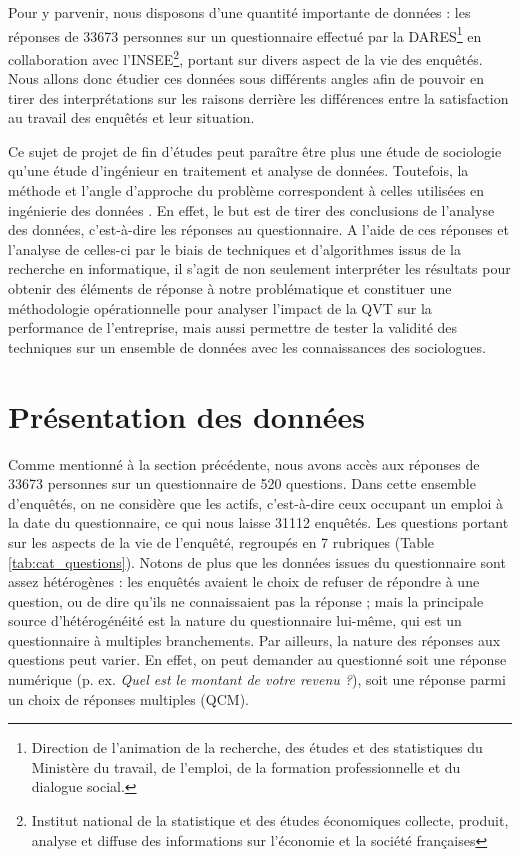\documentclass[11pt,fleqn,a4paper,openany,frenchb]{book} %
\begin{document}
Pour y parvenir, nous disposons d'une quantité importante de données : les réponses de 33673 personnes sur un questionnaire effectué par la DARES\footnote{Direction de l'animation de la recherche, des études et des statistiques du Ministère du travail, de l'emploi, de la formation professionnelle et du dialogue social.} en collaboration avec l'INSEE\footnote{Institut national de la statistique et des études économiques collecte, produit, analyse et diffuse des informations sur l'économie et la société françaises}, portant sur divers aspect de la vie des enquêtés. Nous allons donc étudier ces données sous différents angles afin de pouvoir en tirer des interprétations sur les raisons derrière les différences entre la satisfaction au travail des enquêtés et leur situation.\par

Ce sujet de projet de fin d'études peut paraître être plus une étude de sociologie qu'une étude d'ingénieur en traitement et analyse de données. Toutefois, la méthode et l'angle d'approche du problème correspondent à celles utilisées en ingénierie des données . En effet, le but est de tirer des conclusions de l'analyse des données, c'est-à-dire les réponses au questionnaire. A l'aide de ces réponses et l'analyse de celles-ci par le biais de techniques et d'algorithmes issus de la recherche en informatique, il s'agit de non seulement interpréter les résultats pour obtenir des éléments de réponse à notre problématique et constituer une  méthodologie opérationnelle pour analyser l'impact de la QVT sur la performance de l'entreprise, mais aussi permettre de tester la validité des techniques sur un ensemble de données avec les connaissances des sociologues.\par

\section{Présentation des données}

Comme mentionné à la section précédente, nous avons accès aux réponses de 33673 personnes sur un questionnaire de 520 questions. Dans cette ensemble d'enquêtés, on ne considère que les actifs, c'est-à-dire ceux occupant un emploi à la date du questionnaire, ce qui nous laisse 31112 enquêtés. Les questions portant sur les aspects de la vie de l'enquêté, regroupés en 7 rubriques (Table \ref{tab:cat_questions}). Notons de plus que les données issues du questionnaire sont assez hétérogènes : les enquêtés avaient le choix de refuser de répondre à une question, ou de dire qu'ils ne connaissaient pas la réponse ; mais la principale source d'hétérogénéité est la nature du questionnaire lui-même, qui est un questionnaire à multiples branchements. Par ailleurs, la nature des réponses aux questions peut varier. En effet, on peut demander au questionné soit une réponse numérique (p. ex. \textit{Quel est le montant de votre revenu ?}), soit une réponse parmi un choix de réponses multiples (QCM).\par
\end{document}
